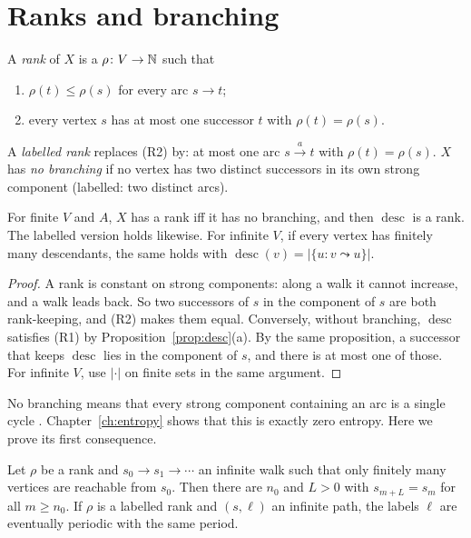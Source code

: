 \section{Ranks and branching}

\begin{definition}\label{def:rank}
A \emph{rank} of \(X\) is a \(\rho\colon V\to\mathbb{N}\) such that
\begin{enumerate}[label=(R\arabic*)]
\item \(\rho(t)\le\rho(s)\) for every arc \(s\to t\);
\item every vertex \(s\) has at most one successor \(t\) with \(\rho(t)=\rho(s)\).
\end{enumerate}
A \emph{labelled rank} replaces (R2) by: at most one arc \(s\xrightarrow{a}t\) with
\(\rho(t)=\rho(s)\). \(X\) has \emph{no branching} if no vertex has two distinct successors in
its own strong component (labelled: two distinct arcs).
\end{definition}

\begin{theorem}\label{thm:rank-complete}
For finite \(V\) and \(A\), \(X\) has a rank iff it has no branching, and then
\(\operatorname{desc}\) is a rank. The labelled version holds likewise. For infinite \(V\), if
every vertex has finitely many descendants, the same holds with
\(\operatorname{desc}(v)=|\{u:v\leadsto u\}|\).
\end{theorem}

\begin{proof}
A rank is constant on strong components: along a walk it cannot increase, and a walk leads
back. So two successors of \(s\) in the component of \(s\) are both rank-keeping, and (R2)
makes them equal. Conversely, without branching, \(\operatorname{desc}\) satisfies (R1) by
Proposition~\ref{prop:desc}(a). By the same proposition, a successor that keeps
\(\operatorname{desc}\) lies in the component of \(s\), and there is at most one of those. For
infinite \(V\), use \(|\cdot|\) on finite sets in the same argument.
\end{proof}

No branching means that every strong component containing an arc is a single cycle
\cite[Def.~2.2.13]{LM95}. Chapter~\ref{ch:entropy} shows that this is exactly zero entropy.
Here we prove its first consequence.

\begin{theorem}\label{thm:evper}
Let \(\rho\) be a rank and \(s_0\to s_1\to\cdots\) an infinite walk such that only finitely many
vertices are reachable from \(s_0\). Then there are \(n_0\) and \(L>0\) with \(s_{m+L}=s_m\) for
all \(m\ge n_0\). If \(\rho\) is a labelled rank and \((s,\ell)\) an infinite path, the labels
\(\ell\) are eventually periodic with the same period.
\end{theorem}

